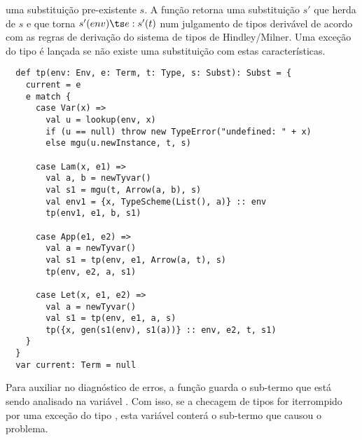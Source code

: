 uma substituição pre-existente $s$.  A função retorna uma substituição
$s'$ que herda de  $s$ e que torna $s'(env) \ts e: s'(t)$ num julgamento de tipos derivável de acordo
com as regras de derivação do sistema de tipos de Hindley/Milner\cite{milner:polymorphism}.  Uma exceção do tipo
 é lançada se não existe uma substituição com estas características.
\begin{lstlisting}
  def tp(env: Env, e: Term, t: Type, s: Subst): Subst = {
    current = e
    e match {
      case Var(x) =>
        val u = lookup(env, x)
        if (u == null) throw new TypeError("undefined: " + x)
        else mgu(u.newInstance, t, s)

      case Lam(x, e1) =>
        val a, b = newTyvar()
        val s1 = mgu(t, Arrow(a, b), s)
        val env1 = {x, TypeScheme(List(), a)} :: env
        tp(env1, e1, b, s1)

      case App(e1, e2) =>
        val a = newTyvar()
        val s1 = tp(env, e1, Arrow(a, t), s)
        tp(env, e2, a, s1)

      case Let(x, e1, e2) =>
        val a = newTyvar()
        val s1 = tp(env, e1, a, s)
        tp({x, gen(s1(env), s1(a))} :: env, e2, t, s1)
    }
  } 
  var current: Term = null
\end{lstlisting}
Para auxiliar no diagnóstico de erros, a função  guarda o sub-termo que
está sendo analisado na variável . Com isso, se a checagem de tipos
for iterrompido por uma exceção do tipo , esta variável conterá o
sub-termo que causou o problema.

